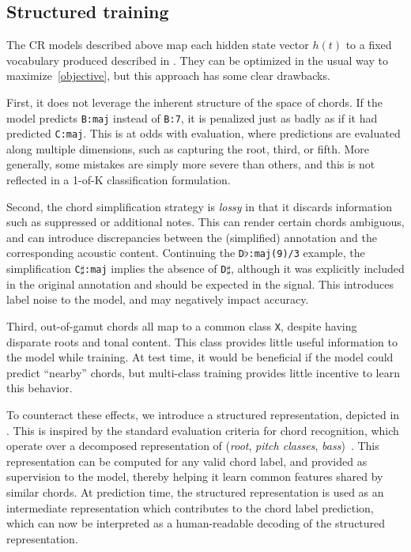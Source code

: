 \documentclass{article}
\begin{document}
\subsection{Structured training}
\label{sec:encoding}

The CR models described above map each hidden state vector $h(t)$ to a fixed vocabulary produced described in .
They can be optimized in the usual way to maximize~\eqref{objective}, but this approach has some clear drawbacks.

First, it does not leverage the inherent structure of the space of chords.
If the model predicts \texttt{B:maj} instead of \texttt{B:7}, it is penalized just as badly as if it had predicted \texttt{C:maj}.
This is at odds with evaluation, where predictions are evaluated along multiple dimensions, such as capturing the root, third, or fifth.
More generally, some mistakes are simply more severe than others, and this is not reflected in a 1-of-K classification formulation.

Second, the chord simplification strategy is \emph{lossy} in that it discards information such as suppressed or additional notes.
This can render certain chords ambiguous, and can introduce discrepancies between the (simplified) annotation and the corresponding acoustic content.
Continuing the \texttt{D}$\flat$\texttt{:maj{(9)}/3} example, the simplification \texttt{C}$\sharp$\texttt{:maj} implies the absence of \texttt{D}$\sharp$, although it was explicitly included in the original annotation and should be expected in the signal.
This introduces label noise to the model, and may negatively impact accuracy.

Third, out-of-gamut chords all map to a common class \texttt{X}, despite having disparate roots and tonal content.
This class provides little useful information to the model while training.
At test time, it would be beneficial if the model could predict ``nearby'' chords, but multi-class training provides little incentive to learn this behavior.


To counteract these effects, we introduce a structured representation, depicted in .
This is inspired by the standard evaluation criteria for chord recognition, which operate over a decomposed representation of (\emph{root}, \emph{pitch classes}, \emph{bass})~\cite{raffel2014mir_eval}.
This representation can be computed for any valid chord label, and provided as supervision to the model, thereby helping it learn common features shared by similar chords.
At prediction time, the structured representation is used as an intermediate representation which contributes to the chord label prediction, which can now be interpreted as a human-readable decoding of the structured representation.
\end{document}
